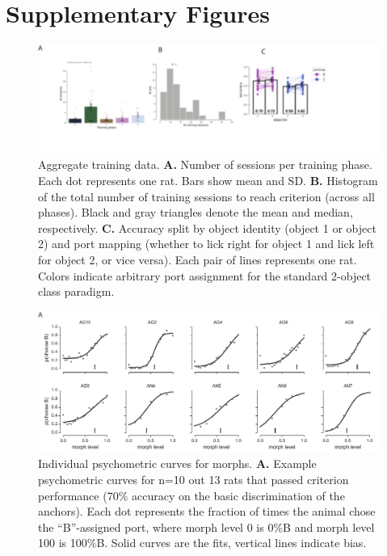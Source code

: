 \section{Supplementary Figures}


\begin{figure}[t!]
\includegraphics[width=\textwidth]{figures/supplemental/fig_s1_aggregate_training/fig_s1_aggregate_training.pdf}
    \vspace{.1in}
    \caption[Aggregate training data]{Aggregate training data. 
    \textbf{A.} Number of sessions per training phase. Each dot represents one rat. Bars show mean and SD.
    \textbf{B.} Histogram of the total number of training sessions to reach criterion (across all phases). Black and gray triangles denote the mean and median, respectively. 
    \textbf{C.} Accuracy split by object identity (object 1 or object 2) and port mapping (whether to lick right for object 1 and lick left for object 2, or vice versa). Each pair of lines represents one rat. Colors indicate arbitrary port assignment for the standard 2-object class paradigm. 
    \label{supfig:aggregate_training}}
\end{figure}


\begin{figure}[t!]
\includegraphics[width=\textwidth]{figures/supplemental/fig_s2_morphs_per_animal/fig_s2_morphs_per_animal.pdf}
    \vspace{.1in}
    \caption[Individual psychometric curves]{Individual psychometric curves for morphs. 
    \textbf{A.} Example psychometric curves for n=10 out 13 rats that passed criterion performance (70\% accuracy on the basic discrimination of the anchors). Each dot represents the fraction of times the animal chose the ``B''-assigned port, where morph level 0 is 0\%B and morph level 100 is 100\%B. Solid curves are the fits, vertical lines indicate bias. 
    \label{supfig:morphs}}
\end{figure}

